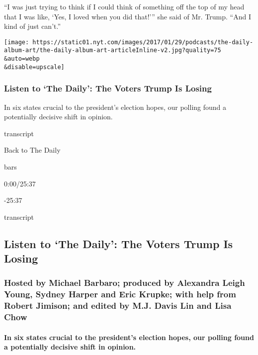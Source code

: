 ``I was just trying to think if I could think of something off the top
of my head that I was like, `Yes, I loved when you did that!''' she said
of Mr. Trump. ``And I kind of just can't.''

\texttt{[image: https://static01.nyt.com/images/2017/01/29/podcasts/the-daily-album-art/the-daily-album-art-articleInline-v2.jpg?quality=75\\\&auto=webp\\\&disable=upscale]}

\hypertarget{listen-to-the-daily-the-voters-trump-is-losing}{%
\subsubsection{Listen to `The Daily': The Voters Trump Is
Losing}\label{listen-to-the-daily-the-voters-trump-is-losing}}

In six states crucial to the president's election hopes, our polling
found a potentially decisive shift in opinion.

transcript

Back to The Daily

bars

0:00/25:37

-25:37

transcript

\hypertarget{listen-to-the-daily-the-voters-trump-is-losing-1}{%
\subsection{Listen to `The Daily': The Voters Trump Is
Losing}\label{listen-to-the-daily-the-voters-trump-is-losing-1}}

\hypertarget{hosted-by-michael-barbaro-produced-by-alexandra-leigh-young-sydney-harper-and-eric-krupke-with-help-from-robert-jimison-and-edited-by-mj-davis-lin-and-lisa-chow}{%
\subsubsection{Hosted by Michael Barbaro; produced by Alexandra Leigh
Young, Sydney Harper and Eric Krupke; with help from Robert Jimison; and
edited by M.J. Davis Lin and Lisa
Chow}\label{hosted-by-michael-barbaro-produced-by-alexandra-leigh-young-sydney-harper-and-eric-krupke-with-help-from-robert-jimison-and-edited-by-mj-davis-lin-and-lisa-chow}}

\hypertarget{in-six-states-crucial-to-the-presidents-election-hopes-our-polling-found-a-potentially-decisive-shift-in-opinion}{%
\paragraph{In six states crucial to the president's election hopes, our
polling found a potentially decisive shift in
opinion.}\label{in-six-states-crucial-to-the-presidents-election-hopes-our-polling-found-a-potentially-decisive-shift-in-opinion}}

